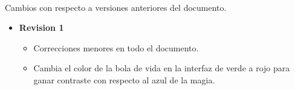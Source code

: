 \paragraph{}
Cambios con respecto a versiones anteriores del documento.

\begin{itemize}
	\item {\bf Revision 1}
		\begin{itemize}
			\item Correcciones menores en todo el documento.
            \item Cambia el color de la bola de vida en la interfaz de verde
            a rojo para ganar contraste con respecto al azul de la magia.
		\end{itemize}
\end{itemize}
